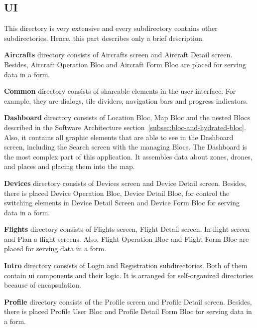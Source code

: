 \subsection{UI}\label{subsec:ui}
This directory is very extensive and every subdirectory contains other subdirectories.
Hence, this part describes only a brief description.


\textbf{Aircrafts} directory consists of Aircrafts screen and Aircraft Detail screen.
Besides, Aircraft Operation Bloc and Aircraft Form Bloc are placed for serving data in a form.


\textbf{Common} directory consists of shareable elements in the user interface.
For example, they are dialogs, tile dividers, navigation bars and progress indicators.


\textbf{Dashboard} directory consists of Location Bloc, Map Bloc and the nested Blocs described in the Software Architecture section~\ref{subsec:bloc-and-hydrated-bloc}.
Also, it contains all graphic elements that are able to see in the Dashboard screen, including the Search screen with the managing Blocs.
The Dashboard is the most complex part of this application.
It assembles data about zones, drones, and places and placing them into the map.


\textbf{Devices} directory consists of Devices screen and Device Detail screen.
Besides, there is placed Device Operation Bloc, Device Detail Bloc, for control the switching elements in Device Detail Screen and Device Form Bloc for serving data in a form.


\textbf{Flights} directory consists of Flights screen, Flight Detail screen, In-flight screen and Plan a flight screens.
Also, Flight Operation Bloc and Flight Form Bloc are placed for serving data in a form.


\textbf{Intro} directory consists of Login and Registration subdirectories.
Both of them contain \acrshort{ui} components and their logic.
It is arranged for self-organized directories because of encapsulation.


\textbf{Profile} directory consists of the Profile screen and Profile Detail screen.
Besides, there is placed Profile User Bloc and Profile Detail Form Bloc for serving data in a form.

